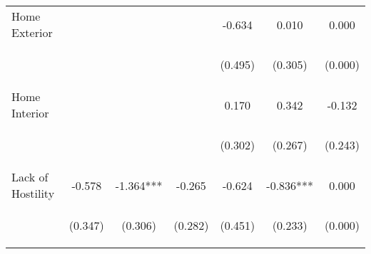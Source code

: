 \begin{tabular}{lcccccc}
\noalign{\smallskip}Home Exterior &  &  &  & -0.634 & 0.010 & 0.000\\
 & \begin{footnotesize}\end{footnotesize} & \begin{footnotesize}\end{footnotesize} & \begin{footnotesize}\end{footnotesize} & \begin{footnotesize}(0.495)\end{footnotesize} & \begin{footnotesize}(0.305)\end{footnotesize} & \begin{footnotesize}(0.000)\end{footnotesize}\\
\noalign{\smallskip}Home Interior &  &  &  & 0.170 & 0.342 & -0.132\\
 & \begin{footnotesize}\end{footnotesize} & \begin{footnotesize}\end{footnotesize} & \begin{footnotesize}\end{footnotesize} & \begin{footnotesize}(0.302)\end{footnotesize} & \begin{footnotesize}(0.267)\end{footnotesize} & \begin{footnotesize}(0.243)\end{footnotesize}\\
\noalign{\smallskip}Lack of Hostility & -0.578 & -1.364*** & -0.265 & -0.624 & -0.836*** & 0.000\\
 & \begin{footnotesize}(0.347)\end{footnotesize} & \begin{footnotesize}(0.306)\end{footnotesize} & \begin{footnotesize}(0.282)\end{footnotesize} & \begin{footnotesize}(0.451)\end{footnotesize} & \begin{footnotesize}(0.233)\end{footnotesize} & \begin{footnotesize}(0.000)\end{footnotesize}\\

\end{tabular}
